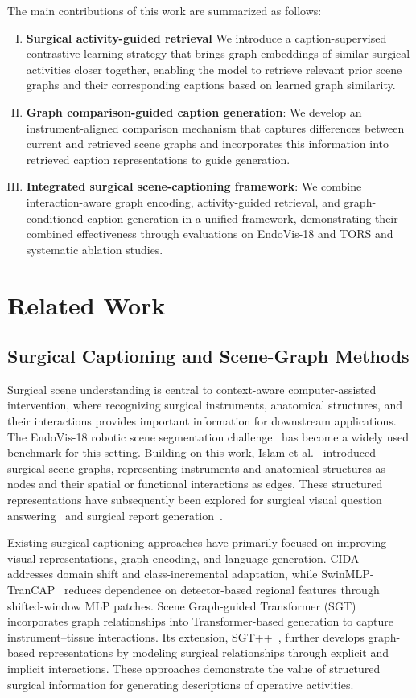 \documentclass[11pt]{article}
\begin{document}
The main contributions of this work are summarized as follows:

\begin{enumerate}[I.]
\item \textbf{Surgical activity-guided retrieval}  We introduce a caption-supervised contrastive learning strategy that brings graph embeddings of similar surgical activities closer together, enabling the model to retrieve relevant prior scene graphs and their corresponding captions based on learned graph similarity.
\item \textbf{Graph comparison-guided caption generation}: We develop an instrument-aligned comparison mechanism that captures differences between current and retrieved scene graphs and incorporates this information into retrieved caption representations to guide generation.
\item \textbf{Integrated surgical scene-captioning framework}: We combine interaction-aware graph encoding, activity-guided retrieval, and graph-conditioned caption generation in a unified framework, demonstrating their combined effectiveness through evaluations on EndoVis-18 and TORS and systematic ablation studies.
\end{enumerate}


\section{Related Work}\label{sec2}

\subsection{Surgical Captioning and Scene-Graph Methods}\label{subsec2.1}

Surgical scene understanding is central to context-aware computer-assisted intervention, where recognizing surgical instruments, anatomical structures, and their interactions provides important information for downstream applications. The EndoVis-18 robotic scene segmentation challenge~\cite{b8} has become a widely used benchmark for this setting. Building on this work, Islam et al.~\cite{b2} introduced surgical scene graphs, representing instruments and anatomical structures as nodes and their spatial or functional interactions as edges. These structured representations have subsequently been explored for surgical visual question answering~\cite{b9} and surgical report generation~\cite{b5,b10}.

Existing surgical captioning approaches have primarily focused on improving visual representations, graph encoding, and language generation. CIDA~\cite{b4} addresses domain shift and class-incremental adaptation, while SwinMLP-TranCAP~\cite{b11} reduces dependence on detector-based regional features through shifted-window MLP patches. Scene Graph-guided Transformer (SGT)~\cite{b5} incorporates graph relationships into Transformer-based generation to capture instrument--tissue interactions. Its extension, SGT++~\cite{b10}, further develops graph-based representations by modeling surgical relationships through explicit and implicit interactions. These approaches demonstrate the value of structured surgical information for generating descriptions of operative activities.
\end{document}
